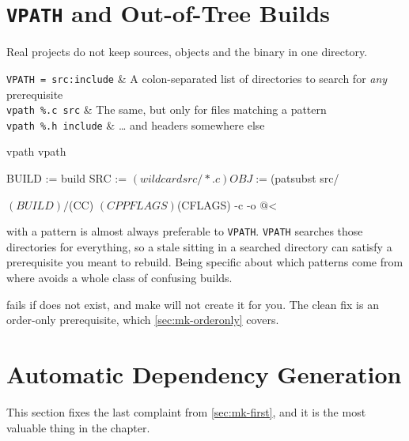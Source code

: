 \section{\texorpdfstring{\texttt{VPATH} and Out-of-Tree Builds}{VPATH and Out-of-Tree Builds}}\label{sec:mk-vpath}

Real projects do not keep sources, objects and the binary in one directory.

\begin{keys}[0.28]
	\texttt{VPATH = src:include} & A colon-separated list of directories to search for \emph{any} prerequisite \\
	\texttt{vpath \%.c src}      & The same, but only for files matching a pattern    \\
	\texttt{vpath \%.h include}  & \dots{} and headers somewhere else                 \\
\end{keys}

\begin{makecode}
vpath %
vpath %

BUILD := build
SRC   := $(wildcard src/*.c)
OBJ   := $(patsubst src/%

$(BUILD)/%
    $(CC) $(CPPFLAGS) $(CFLAGS) -c -o $@ $<
\end{makecode}

\begin{note}
	 with a pattern is almost always preferable to \texttt{VPATH}.
	\texttt{VPATH} searches those directories for everything, so a stale
	 sitting in a searched directory can satisfy a
	prerequisite you meant to rebuild. Being specific about which patterns come
	from where avoids a whole class of confusing builds.
\end{note}

\begin{note}
	 fails if  does not exist, and make will
	not create it for you. The clean fix is an order-only prerequisite, which
	\autoref{sec:mk-orderonly} covers.
\end{note}

\section{Automatic Dependency Generation}\label{sec:mk-depgen}

This section fixes the last complaint from \autoref{sec:mk-first}, and it is the
most valuable thing in the chapter.

